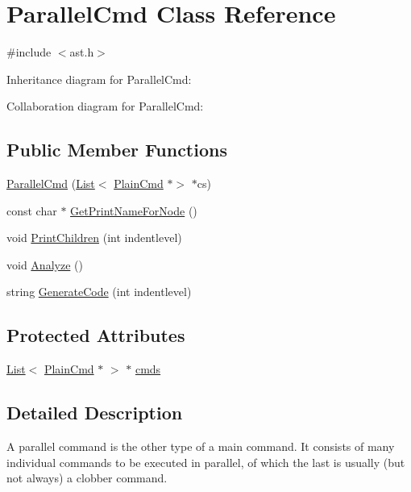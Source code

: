 \hypertarget{class_parallel_cmd}{}\section{Parallel\+Cmd Class Reference}
\label{class_parallel_cmd}


{\ttfamily \#include $<$ast.\+h$>$}



Inheritance diagram for Parallel\+Cmd\+:


Collaboration diagram for Parallel\+Cmd\+:
\subsection*{Public Member Functions}
\begin{DoxyCompactItemize}
\item 
\hyperlink{class_parallel_cmd_a0dbbea6e9939ebb4649880dbb799b09f}{Parallel\+Cmd} (\hyperlink{class_list}{List}$<$ \hyperlink{class_plain_cmd}{Plain\+Cmd} $\ast$$>$ $\ast$cs)
\item 
const char $\ast$ \hyperlink{class_parallel_cmd_a7472916d75c070eda8dce632b39fe195}{Get\+Print\+Name\+For\+Node} ()
\item 
void \hyperlink{class_parallel_cmd_a03464113f3eca068ca4d0fd120cb27cc}{Print\+Children} (int indentlevel)
\item 
void \hyperlink{class_parallel_cmd_afacbf01fd5416bfdc3c20837fefc4dde}{Analyze} ()
\item 
string \hyperlink{class_parallel_cmd_abf18675730f4da91809cc31f7118dc96}{Generate\+Code} (int indentlevel)
\end{DoxyCompactItemize}
\subsection*{Protected Attributes}
\begin{DoxyCompactItemize}
\item 
\hyperlink{class_list}{List}$<$ \hyperlink{class_plain_cmd}{Plain\+Cmd} $\ast$ $>$ $\ast$ \hyperlink{class_parallel_cmd_af8376052ae9639db51ddf67c4e8dc4b9}{cmds}
\end{DoxyCompactItemize}


\subsection{Detailed Description}
A parallel command is the other type of a main command. It consists of many individual commands to be executed in parallel, of which the last is usually (but not always) a clobber command. 

